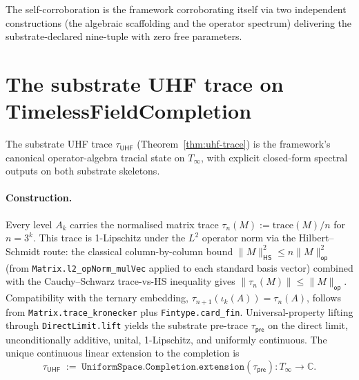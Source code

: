 \documentclass[11pt,a4paper]{amsart}
\theoremstyle{plain}
\theoremstyle{definition}
\begin{document}
The self-corroboration is the framework corroborating itself via two independent constructions (the algebraic scaffolding and the operator spectrum) delivering the substrate-declared nine-tuple with zero free parameters.

\section{The substrate UHF trace on TimelessFieldCompletion}\label{sec:tracial-state}

The substrate UHF trace $\tau_{\textsf{UHF}}$ (Theorem~\ref{thm:uhf-trace}) is the framework's canonical operator-algebra tracial state on $T_\infty$, with explicit closed-form spectral outputs on both substrate skeletons.

\paragraph{Construction.} Every level $A_k$ carries the normalised matrix trace $\tau_n(M) := \mathrm{trace}(M)/n$ for $n = 3^k$. This trace is 1-Lipschitz under the $L^2$ operator norm via the Hilbert--Schmidt route: the classical column-by-column bound $\|M\|_{\textsf{HS}}^2 \le n \|M\|_{\textsf{op}}^2$ (from \texttt{Matrix.l2\_opNorm\_mulVec} applied to each standard basis vector) combined with the Cauchy--Schwarz trace-vs-HS inequality gives $\|\tau_n(M)\| \le \|M\|_{\textsf{op}}$. Compatibility with the ternary embedding, $\tau_{n+1}(\iota_k(A)) = \tau_n(A)$, follows from \texttt{Matrix.trace\_kronecker} plus \texttt{Fintype.card\_fin}. Universal-property lifting through \texttt{DirectLimit.lift} yields the substrate pre-trace $\tau_{\textsf{pre}}$ on the direct limit, unconditionally additive, unital, 1-Lipschitz, and uniformly continuous. The unique continuous linear extension to the completion is
\[
\tau_{\textsf{UHF}} \;:=\; \texttt{UniformSpace.Completion.extension}(\tau_{\textsf{pre}}) \colon T_\infty \to \mathbb{C}.
\]
\end{document}
